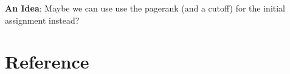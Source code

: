 \documentclass[a4paper,10pt]{article}
\theoremstyle{definition}
\theoremstyle{remark}
\theoremstyle{plain}
\begin{document}
\textbf{An Idea}: Maybe we can use use the pagerank (and a cutoff) for the
initial assignment instead?

%


\nocite{herstein_winter_1989}
\nocite{meyer2000matrix}
\begin{comment}
\section{Tests}
\nocite{herstein_winter_1989}
\nocite{goodfellow2016deep}
\nocite{meyer2000matrix}

%
%
%

\end{comment}

\section{Reference}

%
% 
\printbibliography
\end{document}
